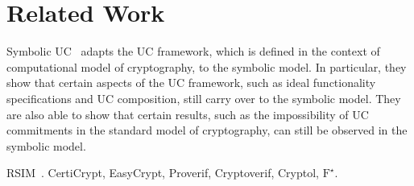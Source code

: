 \section{Related Work}
\label{sec:related}

Symbolic UC~\cite{bohl2016symbolic} adapts the UC framework, which is defined in
the context of computational model of cryptography, to the symbolic model. In
particular, they show that certain aspects of the UC framework, such as ideal
functionality specifications and UC composition, still carry over to the
symbolic model. They are also able to show that certain results, such as the
impossibility of UC commitments in the standard model of cryptography, can still
be observed in the symbolic model.

%

RSIM~\cite{backes2007reactive}. CertiCrypt, EasyCrypt, Proverif, Cryptoverif,
Cryptol, $\text{F}^{\star}$.
